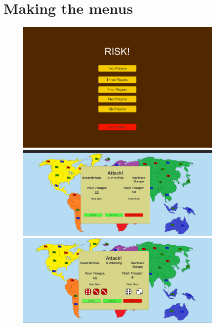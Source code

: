 \documentclass{article}
\begin{document}
	\section{Making the menus}
		\begin{figure}[h!]
			\centering
			\begin{minipage}[c]{0.5\textwidth}
				\includegraphics[width=0.9\textwidth]{mainMenu.png}
			\end{minipage}%
			\begin{minipage}[c]{0.5\textwidth}
				\includegraphics[width=0.9\textwidth]{prog2.png}
			\end{minipage}
			\begin{minipage}[c]{0.5\textwidth}
				\includegraphics[width=0.9\textwidth]{prog3.png}
			\end{minipage}%

\end{figure}
\end{document}
